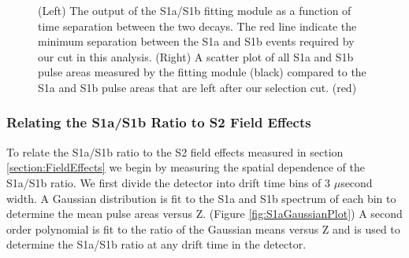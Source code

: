 \documentclass[a4paper,12pt]{article}
\begin{document}
{\begin{figure} [!h]
\centering
{}
\qquad
{}
\caption{ (Left) The output of the S1a/S1b fitting module as a function of time separation between the two decays.  The red line indicate the minimum separation between the S1a and S1b events required by our cut in this analysis. (Right) A scatter plot of all S1a and S1b pulse areas measured by the fitting module (black) compared to the S1a and S1b pulse areas that are left after our selection cut. (red)}
\label{fig:S1aS1btiming}
\end{figure}

\newpage

\subsubsection{Relating the S1a/S1b Ratio to S2 Field Effects} \label{section:S1aS1b2}

To relate the S1a/S1b ratio to the S2 field effects measured in section \ref{section:FieldEffects} we begin by measuring the spatial dependence of the S1a/S1b ratio.  We first divide the detector into drift time bins of 
3 $\mu$second width.   A Gaussian distribution is fit to the S1a and S1b spectrum of each bin to determine the mean pulse areas versus Z. (Figure \ref{fig:S1aGaussianPlot})  A second order polynomial is fit to the ratio of the Gaussian means versus Z and is used to determine the S1a/S1b ratio at any drift time in the detector.  


}
\end{document}

